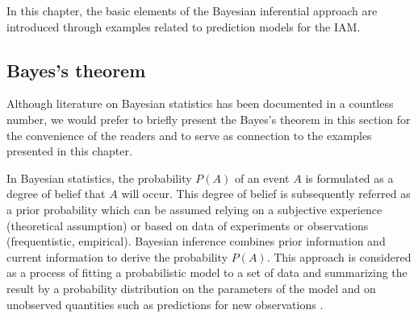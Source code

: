 In this chapter, the basic elements of the Bayesian inferential approach are introduced through examples related to prediction models for the IAM.
%

\subsection{Bayes's theorem}\label{bayesiantheorem}
Although literature on Bayesian statistics has been documented in a countless number, we would prefer to briefly present the Bayes's theorem in this section for the convenience of the readers and to serve as connection to the examples presented in this chapter.

In Bayesian statistics, the probability $P(A)$ of an event $A$ is formulated as a degree of belief that $A$ will occur. This degree of belief is subsequently referred as a prior probability which can be assumed relying on a subjective experience (theoretical assumption) or based on data of experiments or observations (frequentistic, empirical). Bayesian inference combines prior information and current information to derive the probability $P(A)$. This approach is considered as a process of fitting a probabilistic model to a set of data and summarizing the result by a probability distribution on the parameters of the model and on unobserved quantities such as predictions for new observations \cite{Geman1984}.

